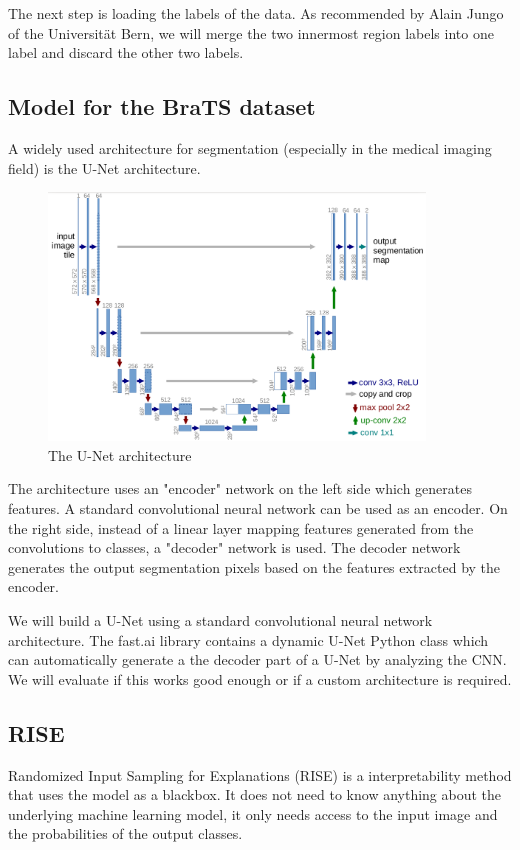 The next step is loading the labels of the data. As recommended by Alain Jungo of the Universität Bern, we will merge the two innermost region labels into one label and discard the other two labels.

\subsection{Model for the BraTS dataset}
A widely used architecture for segmentation (especially in the medical imaging field) is the U-Net\cite{ronneberger2015u} architecture.

\begin{figure}[H]
\centering
\caption{The U-Net architecture}
\includegraphics[width=10cm]{images/unet.png}
\end{figure}

The architecture uses an "encoder" network on the left side which generates features. A standard convolutional neural network can be used as an encoder. On the right side, instead of a linear layer mapping features generated from the convolutions to classes, a "decoder" network is used. The decoder network generates the output segmentation pixels based on the features extracted by the encoder.

We will build a U-Net using a standard convolutional neural network architecture. The fast.ai library contains a dynamic U-Net Python class which can automatically generate a the decoder part of a U-Net by analyzing the CNN. We will evaluate if this works good enough or if a custom architecture is required.

\subsection{RISE}
Randomized Input Sampling for Explanations (RISE) is a interpretability method that uses the model as a blackbox. It does not need to know anything about the underlying machine learning model, it only needs access to the input image and the probabilities of the output classes.

